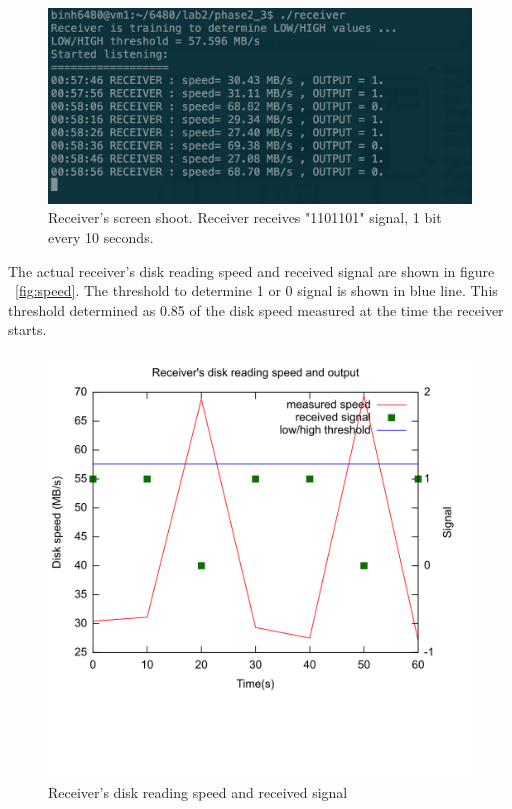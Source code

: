 \begin{figure}[hbtp]
\centering
\includegraphics[scale=0.3]{receiver.png}
\caption{Receiver's screen shoot. Receiver receives "1101101" signal, 1 bit every 10 seconds.}
\label{fig:receiver}
\end{figure}

The actual receiver's disk reading speed and received signal are shown in figure ~\ref{fig:speed}. 
The threshold to determine 1 or 0 signal is shown in blue line. This threshold determined 
as 0.85 of the disk speed measured at the time the receiver starts.\\
\begin{figure}[hbtp]
\centering
\includegraphics[scale=0.15]{speed.png}
\caption{Receiver's disk reading speed and received signal}
\label{fig:receiver}
\end{figure}

